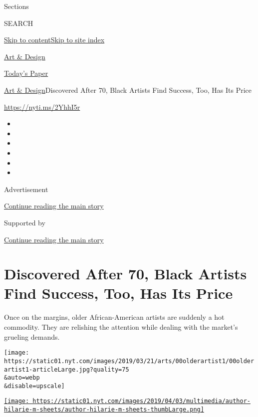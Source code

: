 Sections

SEARCH

\protect\hyperlink{site-content}{Skip to
content}\protect\hyperlink{site-index}{Skip to site index}

\href{https://www.nytimes.com/section/arts/design}{Art \& Design}

\href{https://myaccount.nytimes.com/auth/login?response_type=cookie\&client_id=vi}{}

\href{https://www.nytimes.com/section/todayspaper}{Today's Paper}

\href{/section/arts/design}{Art \& Design}\textbar{}Discovered After 70,
Black Artists Find Success, Too, Has Its Price

\href{https://nyti.ms/2YhhI5r}{https://nyti.ms/2YhhI5r}

\begin{itemize}
\item
\item
\item
\item
\item
\item
\end{itemize}

Advertisement

\protect\hyperlink{after-top}{Continue reading the main story}

Supported by

\protect\hyperlink{after-sponsor}{Continue reading the main story}

\hypertarget{discovered-after-70-black-artists-find-success-too-has-its-price}{%
\section{Discovered After 70, Black Artists Find Success, Too, Has Its
Price}\label{discovered-after-70-black-artists-find-success-too-has-its-price}}

Once on the margins, older African-American artists are suddenly a hot
commodity. They are relishing the attention while dealing with the
market's grueling demands.

\texttt{[image: https://static01.nyt.com/images/2019/03/21/arts/00olderartist1/00olderartist1-articleLarge.jpg?quality=75\\\&auto=webp\\\&disable=upscale]}

\href{https://www.nytimes.com/by/hilarie-m-sheets}{\texttt{[image: https://static01.nyt.com/images/2019/04/03/multimedia/author-hilarie-m-sheets/author-hilarie-m-sheets-thumbLarge.png]}}

